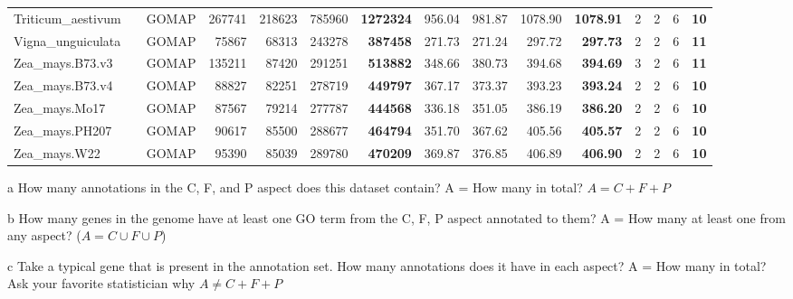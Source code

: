 \documentclass[]{article}
\begin{document}
\begin{table}[t]
{\begin{threeparttable}
\begin{tabular}{lrlrrr>{\bfseries}r|rrr>{\bfseries}r|rrr>{\bfseries}r}
\rowcolor{gray!6}  Triticum\_aestivum &  & GOMAP & 267741 & 218623 & 785960 & 1272324 & 956.04 & 981.87 & 1078.90 & 1078.91 & 2 & 2 & 6 & 10\\

Vigna\_unguiculata &  & GOMAP & 75867 & 68313 & 243278 & 387458 & 271.73 & 271.24 & 297.72 & 297.73 & 2 & 2 & 6 & 11\\

\rowcolor{gray!6}  Zea\_mays.B73.v3 &  & GOMAP & 135211 & 87420 & 291251 & 513882 & 348.66 & 380.73 & 394.68 & 394.69 & 3 & 2 & 6 & 11\\

Zea\_mays.B73.v4 &  & GOMAP & 88827 & 82251 & 278719 & 449797 & 367.17 & 373.37 & 393.23 & 393.24 & 2 & 2 & 6 & 10\\

\rowcolor{gray!6}  Zea\_mays.Mo17 &  & GOMAP & 87567 & 79214 & 277787 & 444568 & 336.18 & 351.05 & 386.19 & 386.20 & 2 & 2 & 6 & 10\\

Zea\_mays.PH207 &  & GOMAP & 90617 & 85500 & 288677 & 464794 & 351.70 & 367.62 & 405.56 & 405.57 & 2 & 2 & 6 & 10\\

\rowcolor{gray!6}  Zea\_mays.W22 & \multirow{-15}{*}{\raggedleft\arraybackslash 100} & GOMAP & 95390 & 85039 & 289780 & 470209 & 369.87 & 376.85 & 406.89 & 406.90 & 2 & 2 & 6 & 10\\
\bottomrule
\end{tabular}
\begin{tablenotes}
\item[a] How many annotations in the C, F, and P aspect does this dataset contain? A = How many in total? $A = C + F + P$
\item[b] How many genes in the genome have at least one GO term from the C, F, P aspect annotated to them? A = How many at least one from any aspect? ($A = C \cup F \cup P$)
\item[c] Take a typical gene that is present in the annotation set. How many annotations does it have in each aspect? A = How many in total? Ask your favorite statistician why $A \neq C + F +P$
\end{tablenotes}
\end{threeparttable}}
\end{table}
\end{document}
